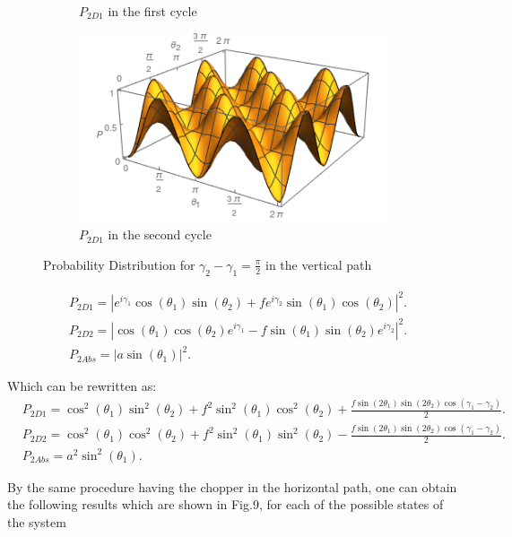 \documentclass[12pt]{book}
\begin{document}
\begin{figure}[t!]
\begin{subfigure}[b]{0.45\linewidth}
\caption{$P_{2D1} $ in the first cycle}
\label{fig:westminster_aerea}
\end{subfigure}
\begin{subfigure}[b]{0.45\linewidth}
\includegraphics[width=\linewidth,height=3 cm]{images/Pc2D12.png}
\caption{$P_{2D1} $ in the second cycle }
\label{fig:BS1}
\end{subfigure}
\caption{Probability Distribution for $\gamma_{2}-\gamma_{1}=\frac{\pi}{2}$ in the vertical path}
\label{fig:westminster}
\end{figure}


\begin{align}
&P_{2D1}=|e^{i\gamma_{1}}\cos(\theta_{1})\sin(\theta_{2})+f e^{i\gamma_{2}}\sin(\theta_{1})\cos(\theta_{2})|^2.\\
&P_{2D2}=|\cos(\theta_{1})\cos(\theta_{2})e^{i\gamma_{1}}- f \sin(\theta_{1})\sin(\theta_{2})e^{i\gamma_{2}}|^2.\\
&P_{2Abs}=|a \sin(\theta_{1})|^2.
\end{align}

Which can be rewritten as:
\begin{align}
& P_{2D1}=\cos^2(\theta_{1})\sin^2(\theta_{2})+f^2 \sin^2(\theta_{1})\cos^2(\theta_{2})+\frac{f \sin(2\theta_{1})\sin(2\theta_{2})\cos(\gamma_{1}-\gamma_{2})}{2}.\\
& P_{2D2}=\cos^2(\theta_{1})\cos^2(\theta_{2})+ f^2 \sin^2(\theta_{1})\sin^2(\theta_{2})-\frac{f \sin(2\theta_{1})\sin(2\theta_{2})\cos(\gamma_{1}-\gamma_{2})}{2}.\\
& P_{2Abs}=a^2 \sin^2(\theta_{1}).
\end{align}

By the same procedure having the chopper in the horizontal path, one can obtain the following results which are shown in Fig.9, for each of the possible states of the system
 
\end{document}
